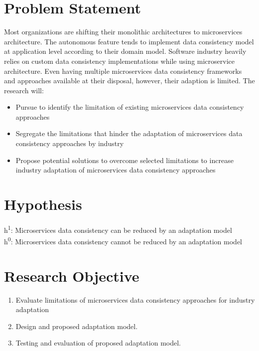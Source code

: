 \documentclass[a4paper,12pt]{article}
\begin{document}
\newpage

\section{Problem Statement}

Most organizations are shifting their monolithic architectures to microservices architecture. The autonomous feature tends to implement data consistency model at application level according to their domain model. Software industry heavily relies on custom data consistency implementations while using microservice architecture. Even having multiple microservices data consistency frameworks and approaches available at their disposal, however, their adaption is limited. The research will:
\begin{itemize}
     

\item	Pursue to identify the limitation of existing microservices data consistency approaches
\item	Segregate the limitations that hinder the adaptation of microservices data consistency approaches by industry
\item	Propose potential solutions to overcome selected limitations to increase industry adaptation of microservices data consistency approaches
\end{itemize}


\section{Hypothesis}
h\textsuperscript{1}: Microservices data consistency can be reduced by an adaptation model
\\
h\textsuperscript{0}: Microservices data consistency cannot be reduced by an adaptation model
\\

\section{Research Objective}
\begin{enumerate}
     
\item	Evaluate limitations of microservices data consistency approaches for industry adaptation
\item	Design and proposed adaptation model.
\item	Testing and evaluation of proposed adaptation model.
\end{enumerate}
\newpage
\end{document}
